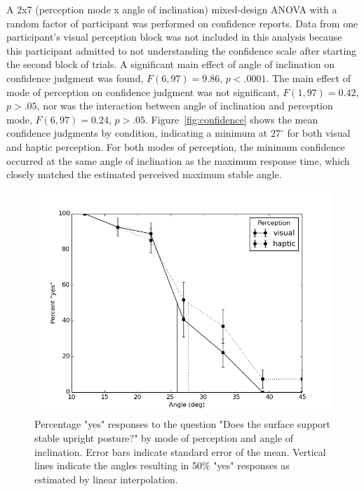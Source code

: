 \documentclass{article}
\begin{document}
A 2x7 (perception mode x angle of inclination) mixed-design ANOVA with a random factor of participant was performed on confidence reports. Data from one participant's visual perception block was not included in this analysis because this participant admitted to not understanding the confidence scale after starting the second block of trials. A significant main effect of angle of inclination on confidence judgment was found, $F(6, 97) = 9.86$, $p < .0001$. The main effect of mode of perception on confidence judgment was not significant, $F(1, 97) = 0.42$, $p > .05$, nor was the interaction between angle of inclination and perception mode, $F(6, 97) = 0.24$, $p > .05$. Figure~\ref{fig:confidence} shows the mean confidence judgments by condition, indicating a minimum at $27^\circ$ for both visual and haptic perception. For both modes of perception, the minimum confidence occurred at the same angle of inclination as the maximum response time, which closely matched the estimated perceived maximum stable angle.

\begin{figure}
\includegraphics[scale=0.7]{can_step.png}
\caption{\label{fig:pct}Percentage "yes" responses to the question "Does the surface support stable upright posture?" by mode of perception and angle of inclination. Error bars indicate standard error of the mean. Vertical lines indicate the angles resulting in 50\% "yes" responses as estimated by linear interpolation.}
\end{figure}
\end{document}
